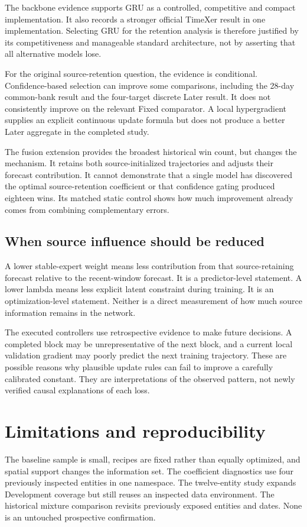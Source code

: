 \documentclass[pdflatex,iicol,sn-mathphys-num]{sn-jnl}
\begin{document}
The backbone evidence supports GRU as a controlled, competitive and compact implementation. It also records a stronger official TimeXer result in one implementation. Selecting GRU for the retention analysis is therefore justified by its competitiveness and manageable standard architecture, not by asserting that all alternative models lose.

For the original source-retention question, the evidence is conditional. Confidence-based selection can improve some comparisons, including the 28-day common-bank result and the four-target discrete Later result. It does not consistently improve on the relevant Fixed comparator. A local hypergradient supplies an explicit continuous update formula but does not produce a better Later aggregate in the completed study.

The fusion extension provides the broadest historical win count, but changes the mechanism. It retains both source-initialized trajectories and adjusts their forecast contribution. It cannot demonstrate that a single model has discovered the optimal source-retention coefficient or that confidence gating produced eighteen wins. Its matched static control shows how much improvement already comes from combining complementary errors.

\subsection{When source influence should be reduced}
A lower stable-expert weight means less contribution from that source-retaining forecast relative to the recent-window forecast. It is a predictor-level statement. A lower lambda means less explicit latent constraint during training. It is an optimization-level statement. Neither is a direct measurement of how much source information remains in the network.

The executed controllers use retrospective evidence to make future decisions. A completed block may be unrepresentative of the next block, and a current local validation gradient may poorly predict the next training trajectory. These are possible reasons why plausible update rules can fail to improve a carefully calibrated constant. They are interpretations of the observed pattern, not newly verified causal explanations of each loss.

\section{Limitations and reproducibility}
The baseline sample is small, recipes are fixed rather than equally optimized, and spatial support changes the information set. The coefficient diagnostics use four previously inspected entities in one namespace. The twelve-entity study expands Development coverage but still reuses an inspected data environment. The historical mixture comparison revisits previously exposed entities and dates. None is an untouched prospective confirmation.
\end{document}
